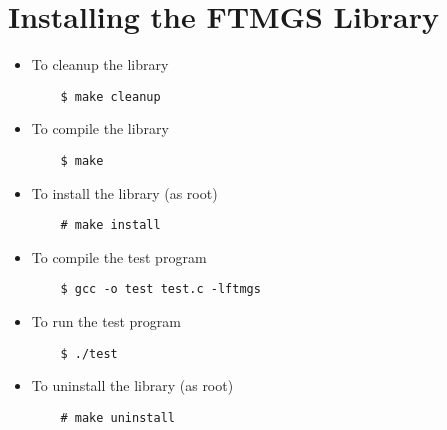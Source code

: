 \documentclass[a4paper]{article}
\begin{document}

\section{Installing the FTMGS Library}

\begin{itemize}%
\item To cleanup the library
\begin{verbatim}
    $ make cleanup
\end{verbatim}
\item To compile the library
\begin{verbatim}
    $ make
\end{verbatim}
\item To install the library (as root)
\begin{verbatim}
    # make install
\end{verbatim}
\item To compile the test program
\begin{verbatim}
    $ gcc -o test test.c -lftmgs
\end{verbatim}
\item To run the test program
\begin{verbatim}
	$ ./test
\end{verbatim}
\item To uninstall the library (as root)
\begin{verbatim}
    # make uninstall
\end{verbatim}
\end{itemize}%
\end{document}
